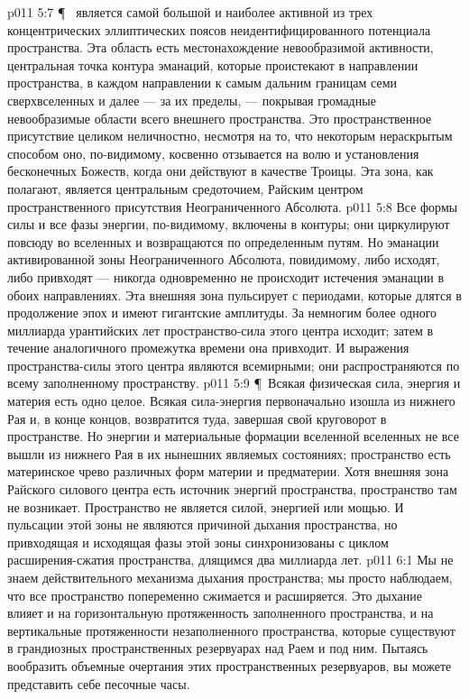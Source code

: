 \vs p011 5:7 \P\  является самой большой и наиболее активной из трех концентрических эллиптических поясов неидентифицированного потенциала пространства. Эта область есть местонахождение невообразимой активности, центральная точка контура эманаций, которые проистекают в направлении пространства, в каждом направлении к самым дальним границам семи сверхвселенных и далее --- за их пределы, --- покрывая громадные невообразимые области всего внешнего пространства. Это пространственное присутствие целиком неличностно, несмотря на то, что некоторым нераскрытым способом оно, по\hyp{}видимому, косвенно отзывается на волю и установления бесконечных Божеств, когда они действуют в качестве Троицы. Эта зона, как полагают, является центральным средоточием, Райским центром пространственного присутствия Неограниченного Абсолюта.
\vs p011 5:8 Все формы силы и все фазы энергии, по\hyp{}видимому, включены в контуры; они циркулируют повсюду во вселенных и возвращаются по определенным путям. Но эманации активированной зоны Неограниченного Абсолюта, повидимому, либо исходят, либо привходят --- никогда одновременно не происходит истечения эманации в обоих направлениях. Эта внешняя зона пульсирует с периодами, которые длятся в продолжение эпох и имеют гигантские амплитуды. За немногим более одного миллиарда урантийских лет пространство\hyp{}сила этого центра исходит; затем в течение аналогичного промежутка времени она привходит. И выражения пространства\hyp{}силы этого центра являются всемирными; они распространяются по всему заполненному пространству.
\vs p011 5:9 \P\ Всякая физическая сила, энергия и материя есть одно целое. Всякая сила\hyp{}энергия первоначально изошла из нижнего Рая и, в конце концов, возвратится туда, завершая свой круговорот в пространстве. Но энергии и материальные формации вселенной вселенных не все вышли из нижнего Рая в их нынешних являемых состояниях; пространство есть материнское чрево различных форм материи и предматерии. Хотя внешняя зона Райского силового центра есть источник энергий пространства, пространство там не возникает. Пространство не является силой, энергией или мощью. И пульсации этой зоны не являются причиной дыхания пространства, но привходящая и исходящая фазы этой зоны синхронизованы с циклом расширения\hyp{}сжатия пространства, длящимся два миллиарда лет.
\vs p011 6:1 Мы не знаем действительного механизма дыхания пространства; мы просто наблюдаем, что все пространство попеременно сжимается и расширяется. Это дыхание влияет и на горизонтальную протяженность заполненного пространства, и на вертикальные протяженности незаполненного пространства, которые существуют в грандиозных пространственных резервуарах над Раем и под ним. Пытаясь вообразить объемные очертания этих пространственных резервуаров, вы можете представить себе песочные часы.
